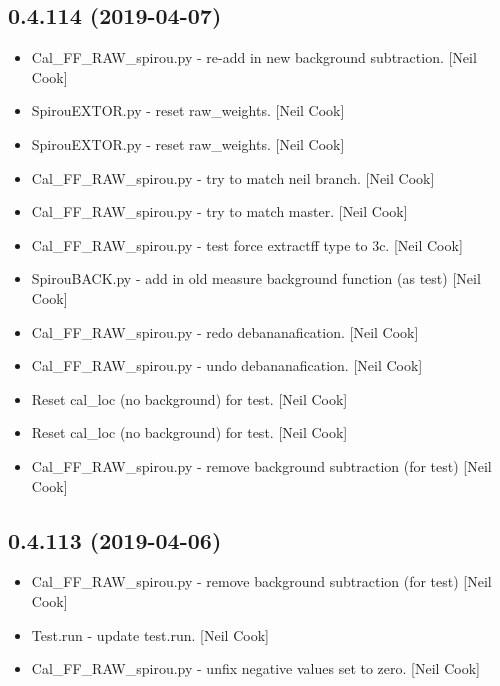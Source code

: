 \documentclass[a4paper,10pt,english]{report}
\begin{document}
\subsection{0.4.114 (2019-04-07)}
\label{\detokenize{misc/changelog:id145}}\begin{itemize}
\item {} 
Cal\_FF\_RAW\_spirou.py - re-add in new background subtraction. {[}Neil
Cook{]}

\item {} 
SpirouEXTOR.py - reset raw\_weights. {[}Neil Cook{]}

\item {} 
SpirouEXTOR.py - reset raw\_weights. {[}Neil Cook{]}

\item {} 
Cal\_FF\_RAW\_spirou.py - try to match neil branch. {[}Neil Cook{]}

\item {} 
Cal\_FF\_RAW\_spirou.py - try to match master. {[}Neil Cook{]}

\item {} 
Cal\_FF\_RAW\_spirou.py - test force extractff type to 3c. {[}Neil Cook{]}

\item {} 
SpirouBACK.py - add in old measure background function (as test) {[}Neil
Cook{]}

\item {} 
Cal\_FF\_RAW\_spirou.py - redo debananafication. {[}Neil Cook{]}

\item {} 
Cal\_FF\_RAW\_spirou.py - undo debananafication. {[}Neil Cook{]}

\item {} 
Reset cal\_loc (no background) for test. {[}Neil Cook{]}

\item {} 
Reset cal\_loc (no background) for test. {[}Neil Cook{]}

\item {} 
Cal\_FF\_RAW\_spirou.py - remove background subtraction (for test) {[}Neil
Cook{]}

\end{itemize}


\subsection{0.4.113 (2019-04-06)}
\label{\detokenize{misc/changelog:id146}}\begin{itemize}
\item {} 
Cal\_FF\_RAW\_spirou.py - remove background subtraction (for test) {[}Neil
Cook{]}

\item {} 
Test.run - update test.run. {[}Neil Cook{]}

\item {} 
Cal\_FF\_RAW\_spirou.py - unfix negative values set to zero. {[}Neil Cook{]}

\end{itemize}
\end{document}
